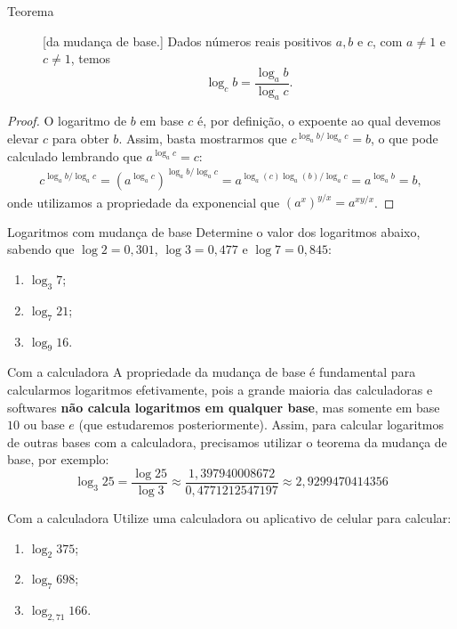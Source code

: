 \label{secao_mud_base}


\begin{description}
\item[Teorema]\label{teo_mud_base}
[da mudança de base.] Dados números reais positivos $a,b$ e $c$, com $a \neq 1$ e $c \neq 1$, temos
$$
\log_c b = \frac{\log_a b}{\log_a c}.
$$
\end{description}
\begin{proof}
O logaritmo de $b$ em base $c$ é, por definição, o expoente ao qual devemos elevar $c$ para obter $b$. Assim, basta mostrarmos que $c^{\log_a b/\log_a c} =b$, o que pode calculado lembrando que $a^{\log_a c}=c$:
\begin{align*}
c^{\log_a b/\log_a c} = (a^{\log_a c})^{\log_a b/\log_a c} =a^{\log_a (c)\log_a (b)/\log_a c} =  a^{\log_a b} = b,
\end{align*}
onde utilizamos a propriedade da exponencial que $(a^x)^{y/x} = a^{xy/x}$.
\end{proof}



\begin{task}{Logaritmos com mudança de base}
Determine o valor dos logaritmos abaixo, sabendo que $\log 2 = 0{,}301$, $\log 3 = 0{,}477$ e $\log 7 = 0{,}845$:
\begin{enumerate}
\item $\log_3 7$;
\item $\log_7 21$;
\item $\log_9 16$.
\end{enumerate}
\end{task}


\begin{observationtitle}{Com a calculadora}
A propriedade da mudança de base é fundamental para calcularmos logaritmos efetivamente, pois a grande maioria das calculadoras e softwares \textbf{não calcula logaritmos em qualquer base}, mas somente em base $10$ ou base $e$ (que estudaremos posteriormente). Assim, para calcular logaritmos de outras bases com a calculadora, precisamos utilizar o teorema da mudança de base, por exemplo:
$$
\log_3 25 = \frac{\log 25}{\log 3} \approx \frac{1{,}397940008672}{0{,}4771212547197} \approx 2{,}9299470414356
$$
\end{observationtitle}


\begin{task}{Com a calculadora}
Utilize uma calculadora ou aplicativo de celular para calcular:
\begin{enumerate}
\item $\log_2 375$;
\item $\log_7 698$;
\item $\log_{2{,}71} 166$.
\end{enumerate}
\end{task}

